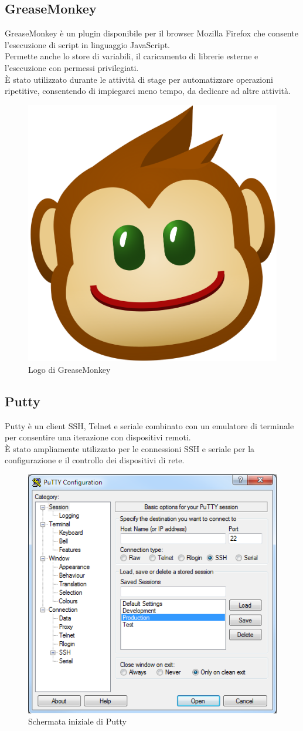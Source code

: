 \documentclass[Tesi.tex]{subfiles}
\begin{document}
\subsection{GreaseMonkey}
GreaseMonkey è un plugin disponibile per il browser Mozilla Firefox che consente l'esecuzione di script in linguaggio JavaScript. \\
Permette anche lo store di variabili, il caricamento di librerie esterne e l'esecuzione con permessi privilegiati. \\
\`{E} stato utilizzato durante le attività di stage per automatizzare operazioni ripetitive, consentendo di impiegarci meno tempo, da dedicare ad altre attività.
\begin{figure}[H]
	\centering
	\includegraphics[width=0.14\linewidth]{"images/logo/GreaseMonkey_logo"}
	\caption{Logo di GreaseMonkey}
	\label{fig:Logo di GreaseMonkey}
\end{figure}

\subsection{Putty}
Putty è un client SSH, Telnet e seriale combinato con un emulatore di terminale per consentire una iterazione con dispositivi remoti. \\
\`{E} stato ampliamente utilizzato per le connessioni SSH e seriale per la configurazione e il controllo dei dispositivi di rete.
\begin{figure}[H]
	\centering
	\includegraphics[width=0.62\linewidth]{"images/putty"}
	\caption{Schermata iniziale di Putty}
	\label{fig:Schermata iniziale di Putty}
\end{figure}
\end{document}
